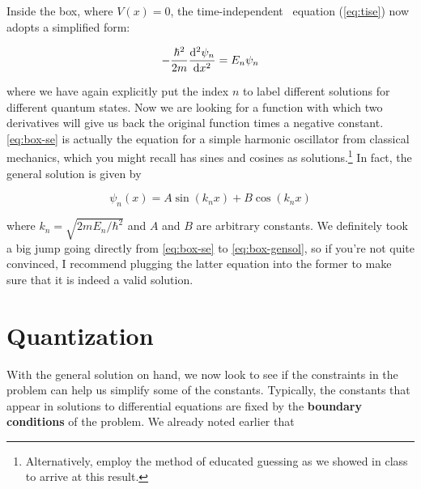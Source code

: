 Inside the box, where $V(x) = 0$, the time-independent \Sch\ equation (\autoref{eq:tise}) now adopts a simplified form:

\begin{tcolorbox}[title=\Sch\ equation for particle in a box] \vspace{-2ex}
	\begin{equation}
		-\frac{\hbar^2}{2m} \dv[2]{\psi_n}{x} = E_n\psi_n  \label{eq:box-se}
	\end{equation}
\end{tcolorbox}

\noindent where we have again explicitly put the index $n$ to label different solutions for different quantum states. 
Now we are looking for a function with which two derivatives will give us back the original function times a negative constant. 
\autoref{eq:box-se} is actually the equation for a simple harmonic oscillator from classical mechanics, which you might recall has sines and cosines as solutions.\footnote{Alternatively, employ the method of educated guessing as we showed in class to arrive at this result.} 
In fact, the general solution is given by 

\begin{tcolorbox}[title=General solution to particle in a box] \vspace{-2ex}
	\begin{equation}
		\psi_n(x) = A\sin(k_nx) + B\cos(k_nx) \label{eq:box-gensol}
	\end{equation}
\end{tcolorbox}

\noindent where $k_n = \sqrt{2mE_n/\hbar^2}$ and $A$ and $B$ are arbitrary constants. 
We definitely took a big jump going directly from \autoref{eq:box-se} to \autoref{eq:box-gensol}, so if you're not quite convinced, I recommend plugging the latter equation into the former to make sure that it is indeed a valid solution.


\section{Quantization}

With the general solution on hand, we now look to see if the constraints in the problem can help us simplify some of the constants. 
Typically, the constants that appear in solutions to differential equations are fixed by the \textbf{boundary conditions} of the problem. 
We already noted earlier that

